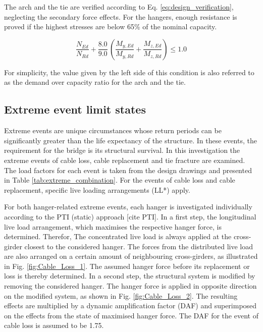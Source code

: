

The arch and the tie are verified according to Eq. \eqref{eq:design_verification}, neglecting the secondary force effects. For the hangers, enough resistance is proved if the highest stresses are below 65\% of the nominal capacity. 

\begin{equation}
    \frac{N_{Ed}}{N_{Rd}} + \frac{8.0}{9.0}\, \left(\frac{M_{y,Ed}}{M_{y,Rd}}+\frac{M_{z,Ed}}{M_{z,Rd}} \right) \leq 1.0
    \label{eq:design_verification}
\end{equation}

For simplicity, the value given by the left side of this condition is also referred to as the demand over capacity ratio for the arch and the tie.

\subsection{Extreme event limit states}
Extreme events are unique circumstances whose return periods can be significantly greater than the life expectancy of the structure. In these events, the requirement for the bridge is its structural survival. In this investigation the extreme events of cable loss, cable replacement and tie fracture are examined. The load factors for each event is taken from the design drawings and presented in Table \ref{tab:extreme_combination}. For the events of cable loss and cable replacement, specific live loading arrangements (LL*) apply.



For both hanger-related extreme events, each hanger is investigated individually according to the PTI (static) approach [cite PTI]. In a first step, the longitudinal live load arrangement, which maximises the respective hanger force, is determined. Therefor, The concentrated live load is always applied at the cross-girder closest to the considered hanger. The forces from the distributed live load are also arranged on a certain amount of neighbouring cross-girders, as illustrated in Fig. \ref{fig:Cable_Loss_1}. The assumed hanger force before its replacement or loss is thereby determined. In a second step, the structural system is modified by removing the considered hanger. The hanger force is applied in opposite direction on the modified system, as shown in Fig. \ref{fig:Cable_Loss_2}. The resulting effects are multiplied by a dynamic amplification factor (DAF) and superimposed on the effects from the state of maximised hanger force. The DAF for the event of cable loss is assumed to be 1.75.

